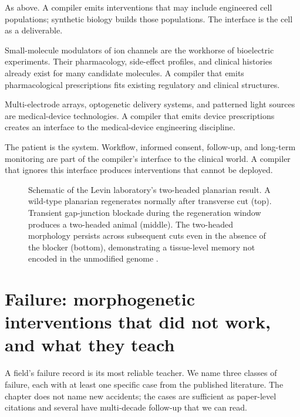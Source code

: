  As above. A compiler emits
interventions that may include engineered cell populations; synthetic
biology builds those populations. The interface is the cell as a
deliverable.

 Small-molecule modulators of ion channels
are the workhorse of bioelectric experiments. Their pharmacology,
side-effect profiles, and clinical histories already exist for many
candidate molecules. A compiler that emits pharmacological
prescriptions fits existing regulatory and clinical structures.

 Multi-electrode arrays, optogenetic
delivery systems, and patterned light sources are medical-device
technologies. A compiler that emits device prescriptions creates an
interface to the medical-device engineering discipline.

 The patient is the system. Workflow,
informed consent, follow-up, and long-term monitoring are part of the
compiler's interface to the clinical world. A compiler that ignores
this interface produces interventions that cannot be deployed.

\begin{figure}[ht]
  \centering
  
  \caption{Schematic of the Levin laboratory's two-headed planarian
  result. A wild-type planarian regenerates normally after transverse
  cut (top). Transient gap-junction blockade during the regeneration
  window produces a two-headed animal (middle). The two-headed
  morphology persists across subsequent cuts even in the absence of
  the blocker (bottom), demonstrating a tissue-level memory not
  encoded in the unmodified genome
  \cite{paper:v6c13-oviedo-planarian-2010}.}
  \label{fig:vol06ch13-two-headed-planarian}
\end{figure}

\section{Failure: morphogenetic interventions that did not work, and what they teach}

A field's failure record is its most reliable teacher. We name three
classes of failure, each with at least one specific case from the
published literature. The chapter does not name new accidents; the
cases are sufficient as paper-level citations and several have
multi-decade follow-up that we can read.

